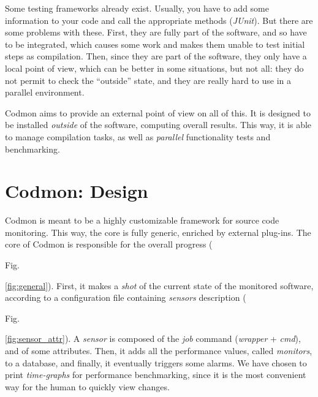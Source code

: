 \documentclass[a4paper,10pt]{article}
\renewcommand{\|}{\url|}
\begin{document}

Some testing frameworks already exist. Usually, you have to add some information to your code and call the appropriate methods (\emph{JUnit}). But there are some problems with these. First, they are fully part of the software, and so have to be integrated, which causes some work and makes them unable to test initial steps as compilation. Then, since they are part of the software, they only have a local point of view, which can be better in some situations, but not all: they do not permit to check the ``outside'' state, and they are really hard to use in a parallel environment.

Codmon aims to provide an external point of view on all of this. It is designed to be installed \emph{outside} of the software, computing overall results. This way, it is able to manage compilation tasks, as well as \emph{parallel} functionality tests and benchmarking.

\section{Codmon: Design}

Codmon is meant to be a highly customizable framework for source code monitoring. This way, the core is fully generic, enriched by external plug-ins. The core of Codmon is responsible for the overall progress (\begin{sc}Fig.\end{sc} \ref{fig:general}). First, it makes a \emph{shot} of the current state of the monitored software, according to a configuration file containing \emph{sensors} description (\begin{sc}Fig.\end{sc} \ref{fig:sensor_attr}). A \emph{sensor} is composed of the \emph{job} command (\emph{wrapper} + \emph{cmd}), and of some attributes. Then, it adds all the performance values, called \emph{monitors}, to a database, and finally, it eventually triggers some alarms. We have chosen to print \emph{time-graphs} for performance benchmarking, since it is the most convenient way for the human to quickly view changes.
\end{document}
